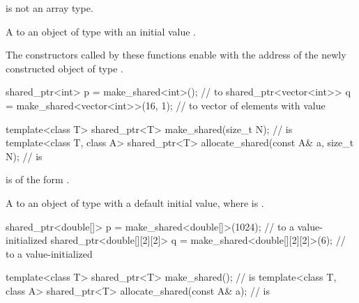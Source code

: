 \begin{itemdescr}
\pnum
\constraints
{} is not an array type.

\pnum
\returns
A  to an object of type 
with an initial value .

\pnum
\remarks
The  constructors called by these functions
enable 
with the address of the newly constructed object of type .

\pnum
\begin{example}
\begin{codeblock}
shared_ptr<int> p = make_shared<int>(); //  to 
shared_ptr<vector<int>> q = make_shared<vector<int>>(16, 1);
  //  to vector of  elements with value 
\end{codeblock}
\end{example}
\end{itemdescr}

%
%
\begin{itemdecl}
template<class T> shared_ptr<T>
  make_shared(size_t N);                                        //  is 
template<class T, class A>
  shared_ptr<T> allocate_shared(const A& a, size_t N);          //  is 
\end{itemdecl}

\begin{itemdescr}
\pnum
\constraints
{} is of the form .

\pnum
\returns
A  to an object of type 
with a default initial value,
where  is .

\pnum
\begin{example}
\begin{codeblock}
shared_ptr<double[]> p = make_shared<double[]>(1024);
  //  to a value-initialized 
shared_ptr<double[][2][2]> q = make_shared<double[][2][2]>(6);
  //  to a value-initialized 
\end{codeblock}
\end{example}
\end{itemdescr}

%
%
\begin{itemdecl}
template<class T>
  shared_ptr<T> make_shared();                                  //  is 
template<class T, class A>
  shared_ptr<T> allocate_shared(const A& a);                    //  is 
\end{itemdecl}

